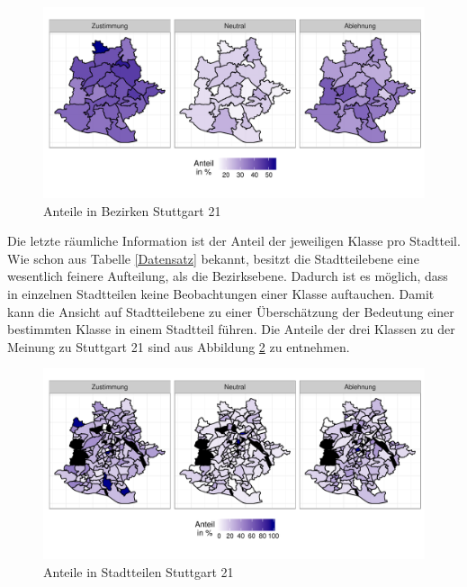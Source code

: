 \documentclass{Vorlage}
\begin{document}
\begin{figure}[h]
 \begin{center}
 \includegraphics[scale=0.8]{Pictures/BStuttgart3}
 \caption{Anteile in Bezirken Stuttgart 21}
 \label{BStuttgart21}
 \end{center}
\end{figure}

Die letzte räumliche Information ist der Anteil der jeweiligen Klasse pro Stadtteil. Wie schon aus Tabelle \ref{Datensatz} bekannt, besitzt die Stadtteilebene eine wesentlich feinere Aufteilung, als die Bezirksebene. Dadurch ist es möglich, dass in einzelnen Stadtteilen keine Beobachtungen einer Klasse auftauchen. Damit kann die Ansicht auf Stadtteilebene zu einer Überschätzung der Bedeutung einer bestimmten Klasse in einem Stadtteil führen. Die Anteile der drei Klassen zu der Meinung zu Stuttgart 21 sind aus Abbildung \ref{SStuttgart21} zu entnehmen.

\begin{figure}[h]
 \begin{center}
 \includegraphics[scale=0.8]{Pictures/SStuttgart3}
 \caption{Anteile in Stadtteilen Stuttgart 21}
 \label{SStuttgart21}
 \end{center}
\end{figure}
\end{document}
